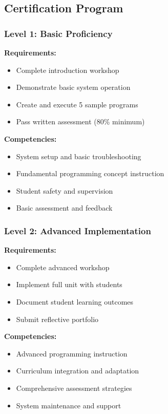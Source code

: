 \subsection{Certification Program}

\subsubsection{Level 1: Basic Proficiency}

\textbf{Requirements:}
\begin{itemize}
    \item Complete introduction workshop
    \item Demonstrate basic system operation
    \item Create and execute 5 sample programs
    \item Pass written assessment (80\% minimum)
\end{itemize}

\textbf{Competencies:}
\begin{itemize}
    \item System setup and basic troubleshooting
    \item Fundamental programming concept instruction
    \item Student safety and supervision
    \item Basic assessment and feedback
\end{itemize}

\subsubsection{Level 2: Advanced Implementation}

\textbf{Requirements:}
\begin{itemize}
    \item Complete advanced workshop
    \item Implement full unit with students
    \item Document student learning outcomes
    \item Submit reflective portfolio
\end{itemize}

\textbf{Competencies:}
\begin{itemize}
    \item Advanced programming instruction
    \item Curriculum integration and adaptation
    \item Comprehensive assessment strategies
    \item System maintenance and support
\end{itemize}

